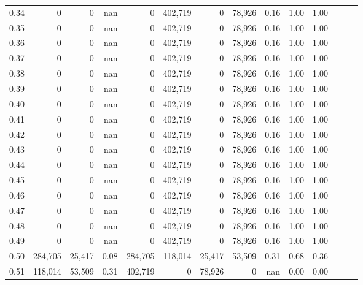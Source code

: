 \begin{tabular}{rrrrrrrrrrrrrr}
0.34 &        0 &       0 &   nan &        0 &  402,719 &       0 &  78,926 &  0.16 &  1.00 &      1.00 \\
0.35 &        0 &       0 &   nan &        0 &  402,719 &       0 &  78,926 &  0.16 &  1.00 &      1.00 \\
0.36 &        0 &       0 &   nan &        0 &  402,719 &       0 &  78,926 &  0.16 &  1.00 &      1.00 \\
0.37 &        0 &       0 &   nan &        0 &  402,719 &       0 &  78,926 &  0.16 &  1.00 &      1.00 \\
0.38 &        0 &       0 &   nan &        0 &  402,719 &       0 &  78,926 &  0.16 &  1.00 &      1.00 \\
0.39 &        0 &       0 &   nan &        0 &  402,719 &       0 &  78,926 &  0.16 &  1.00 &      1.00 \\
0.40 &        0 &       0 &   nan &        0 &  402,719 &       0 &  78,926 &  0.16 &  1.00 &      1.00 \\
0.41 &        0 &       0 &   nan &        0 &  402,719 &       0 &  78,926 &  0.16 &  1.00 &      1.00 \\
0.42 &        0 &       0 &   nan &        0 &  402,719 &       0 &  78,926 &  0.16 &  1.00 &      1.00 \\
0.43 &        0 &       0 &   nan &        0 &  402,719 &       0 &  78,926 &  0.16 &  1.00 &      1.00 \\
0.44 &        0 &       0 &   nan &        0 &  402,719 &       0 &  78,926 &  0.16 &  1.00 &      1.00 \\
0.45 &        0 &       0 &   nan &        0 &  402,719 &       0 &  78,926 &  0.16 &  1.00 &      1.00 \\
0.46 &        0 &       0 &   nan &        0 &  402,719 &       0 &  78,926 &  0.16 &  1.00 &      1.00 \\
0.47 &        0 &       0 &   nan &        0 &  402,719 &       0 &  78,926 &  0.16 &  1.00 &      1.00 \\
0.48 &        0 &       0 &   nan &        0 &  402,719 &       0 &  78,926 &  0.16 &  1.00 &      1.00 \\
0.49 &        0 &       0 &   nan &        0 &  402,719 &       0 &  78,926 &  0.16 &  1.00 &      1.00 \\
0.50 &  284,705 &  25,417 &  0.08 &  284,705 &  118,014 &  25,417 &  53,509 &  0.31 &  0.68 &      0.36 \\
0.51 &  118,014 &  53,509 &  0.31 &  402,719 &        0 &  78,926 &       0 &   nan &  0.00 &      0.00 \\

\end{tabular}
